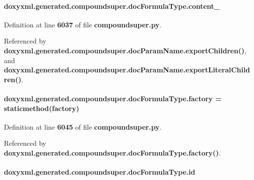 \paragraph[{content\+\_\+}]{\setlength{\rightskip}{0pt plus 5cm}doxyxml.\+generated.\+compoundsuper.\+doc\+Formula\+Type.\+content\+\_\+}\label{classdoxyxml_1_1generated_1_1compoundsuper_1_1docFormulaType_a826fbe2d94e18d67f852577204428c76}


Definition at line {\bf 6037} of file {\bf compoundsuper.\+py}.



Referenced by {\bf doxyxml.\+generated.\+compoundsuper.\+doc\+Param\+Name.\+export\+Children()}, and {\bf doxyxml.\+generated.\+compoundsuper.\+doc\+Param\+Name.\+export\+Literal\+Children()}.

\paragraph[{factory}]{\setlength{\rightskip}{0pt plus 5cm}doxyxml.\+generated.\+compoundsuper.\+doc\+Formula\+Type.\+factory = staticmethod(factory)\hspace{0.3cm}{\ttfamily [static]}}\label{classdoxyxml_1_1generated_1_1compoundsuper_1_1docFormulaType_aff7ca548282751ad43a8836bae3e4d22}


Definition at line {\bf 6045} of file {\bf compoundsuper.\+py}.



Referenced by {\bf doxyxml.\+generated.\+compoundsuper.\+doc\+Formula\+Type.\+factory()}.

\paragraph[{id}]{\setlength{\rightskip}{0pt plus 5cm}doxyxml.\+generated.\+compoundsuper.\+doc\+Formula\+Type.\+id}\label{classdoxyxml_1_1generated_1_1compoundsuper_1_1docFormulaType_a11f412c72c6e5eec32ec31664d34636b}


